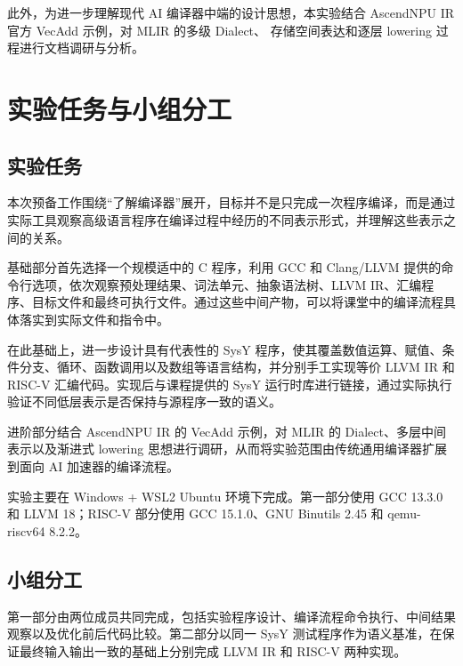 \documentclass[12pt,a4paper]{ctexart}
\begin{document}
此外，为进一步理解现代 AI 编译器中端的设计思想，本实验结合
AscendNPU IR 官方 VecAdd 示例，对 MLIR 的多级 Dialect、
存储空间表达和逐层 lowering 过程进行文档调研与分析。

\section{实验任务与小组分工}

\subsection{实验任务}

本次预备工作围绕“了解编译器”展开，目标并不是只完成一次程序编译，而是通过实际工具观察高级语言程序在编译过程中经历的不同表示形式，并理解这些表示之间的关系。

基础部分首先选择一个规模适中的 C 程序，利用 GCC 和 Clang/LLVM 提供的命令行选项，依次观察预处理结果、词法单元、抽象语法树、LLVM IR、汇编程序、目标文件和最终可执行文件。通过这些中间产物，可以将课堂中的编译流程具体落实到实际文件和指令中。

在此基础上，进一步设计具有代表性的 SysY 程序，使其覆盖数值运算、赋值、条件分支、循环、函数调用以及数组等语言结构，并分别手工实现等价 LLVM IR 和 RISC-V 汇编代码。实现后与课程提供的 SysY 运行时库进行链接，通过实际执行验证不同低层表示是否保持与源程序一致的语义。

进阶部分结合 AscendNPU IR 的 VecAdd 示例，对 MLIR 的 Dialect、多层中间表示以及渐进式 lowering 思想进行调研，从而将实验范围由传统通用编译器扩展到面向 AI 加速器的编译流程。

实验主要在 Windows + WSL2 Ubuntu 环境下完成。第一部分使用 GCC 13.3.0 和 LLVM 18；RISC-V 部分使用 GCC 15.1.0、GNU Binutils 2.45 和 qemu-riscv64 8.2.2。

\subsection{小组分工}

第一部分由两位成员共同完成，包括实验程序设计、编译流程命令执行、中间结果观察以及优化前后代码比较。第二部分以同一 SysY 测试程序作为语义基准，在保证最终输入输出一致的基础上分别完成 LLVM IR 和 RISC-V 两种实现。
\end{document}
